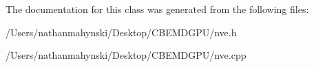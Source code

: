 The documentation for this class was generated from the following files\-:\begin{DoxyCompactItemize}
\item 
/\-Users/nathanmahynski/\-Desktop/\-C\-B\-E\-M\-D\-G\-P\-U/nve.\-h\item 
/\-Users/nathanmahynski/\-Desktop/\-C\-B\-E\-M\-D\-G\-P\-U/nve.\-cpp\end{DoxyCompactItemize}
